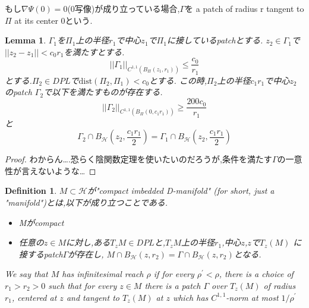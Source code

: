 \documentclass{ujarticle}
\newtheorem{dfn}[thm]{Definition}
\newtheorem{lem}[thm]{Lemma}
\newcommand{\bh}[2]{B_{\mathcal{H}}(#1,#2)}
\newcommand{\bp}[3]{B_{\Pi_{#3}}(#1,#2)}
\newcommand{\gn}[4]{||\Gamma_{#1}||_{C^{1,1}(\bp{#2}{#3}{#4})}}
\newcommand{\gnaaad}{||\Gamma_1||_{C^{1,1}(\bp{z_1}{r_1}{})}}
\begin{document}
もし$ \nabla \Psi(0)=0$(0写像)が成り立っている場合,$\Gamma$を
a patch of radius r tangent to $\Pi$ at its center 0という.

\begin{lem}
  $\Gamma_1$を$\Pi_1$上の半径$r_1$で中心$z_1$で$\Pi_1$に接しているpatchとする.
  $z_2 \in \Gamma_1$で$||z_2 -z_1 || < c_0r_1$を満たすとする.
  \begin{equation*}
   \gnaaad \le \frac{c_0}{r_1}
  \end{equation*}
  とする.$\Pi_2 \in DPL$で$\mathrm{dist}(\Pi_2,\Pi_1) <c_0$とする.
  この時,$\Pi_2$上の半径$c_1r_1$で中心$z_2$のpatch $\Gamma_2$で以下を満たすものが存在する.
  \begin{equation*}
   \gn{2}{0}{c_1r_1}{} \ge \frac{200c_0}{r_1}
  \end{equation*}
と
\begin{equation*}
\Gamma_2 \cap \bh{z_2}{\frac{c_1r_1}{2}} = \Gamma_1 \cap \bh{z_2}{\frac{c_1r_1}{2}}
\end{equation*}
\end{lem}
\begin{proof}
 わからん….恐らく陰関数定理を使いたいのだろうが,条件を満たす$\Gamma$の一意性が言えないような…
\end{proof}

\begin{dfn}
  $M \subset \mathcal{H}$が"compact imbedded D-manifold" (for short, just a "manifold")とは,以下が成り立つことである.
\begin{itemize}
  \item Mがcompact
  \item 任意の$z \in M$に対し,ある$T_zM \in DPL$と,$T_zM$上の半径$r_1$,中心$z$,$z$で$T_z(M)$
  に接するpatch$\Gamma$が存在し,
  $M \cap B_{\mathcal{H}}(z,r_2)=\Gamma \cap B_{\mathcal{H}}(z,r_2)$となる.
\end{itemize}
We say that $M$ has infinitesimal reach $\rho$ if for every $\rho^{\prime} < \rho$, there is a choice of $r_1 > r_2 > 0$ such that
for every $z \in M$ there is a patch $\Gamma$ over $T_z(M)$ of radius $r_1$, centered at $z$ and tangent to $T_z(M)$ at $z$ which has $C^{1,1}$-norm at most $1/\rho^{\prime}$
\end{dfn}
\end{document}
